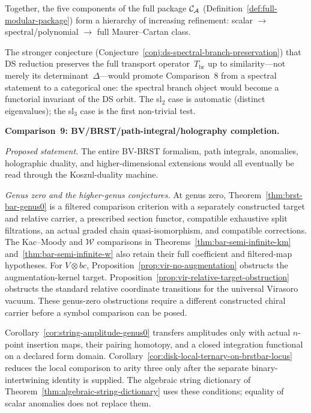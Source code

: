 Together, the five components of the full package
$\mathcal{C}_{\mathcal{A}}$
(Definition~\ref{def:full-modular-package}) form a hierarchy
of increasing refinement: scalar $\to$ spectral/polynomial
$\to$ full Maurer--Cartan class.

The stronger conjecture
(Conjecture~\ref{conj:ds-spectral-branch-preservation}) that
DS reduction preserves the full transport operator~$T_{\mathrm{br}}$
up to similarity---not merely its determinant~$\Delta$---would
promote Comparison~8 from a spectral statement to a categorical one:
the spectral branch object would become a functorial invariant of
the DS orbit.  The sl${}_2$ case is automatic (distinct eigenvalues);
the sl${}_3$ case is the first non-trivial test.

\medskip

\noindent\textbf{Comparison~9: BV/BRST/path-integral/holography
completion.}

\emph{Proposed statement.}
The entire BV-BRST formalism, path integrals, anomalies,
holographic duality, and higher-dimensional extensions would all
eventually be read through the Koszul-duality machine.

\emph{Genus zero and the higher-genus conjectures.}
At genus zero, Theorem~\ref{thm:brst-bar-genus0} is a filtered comparison criterion with a separately constructed target and relative carrier, a prescribed section functor, compatible exhaustive split filtrations, an actual graded chain quasi-isomorphism, and compatible corrections.
The Kac--Moody and $\mathcal W$ comparisons in Theorems~\ref{thm:bar-semi-infinite-km} and~\ref{thm:bar-semi-infinite-w} also retain their full coefficient and filtered-map hypotheses.
For $V\otimes bc$, Proposition~\ref{prop:vir-no-augmentation} obstructs the augmentation-kernel target.
Proposition~\ref{prop:vir-relative-target-obstruction} obstructs the standard relative coordinate transitions for the universal Virasoro vacuum.
These genus-zero obstructions require a different constructed chiral carrier before a symbol comparison can be posed.

Corollary~\ref{cor:string-amplitude-genus0} transfers amplitudes only with actual $n$-point insertion maps, their pairing homotopy, and a closed integration functional on a declared form domain.
Corollary~\ref{cor:disk-local-ternary-on-brstbar-locus} reduces the local comparison to arity three only after the separate binary-intertwining identity is supplied.
The algebraic string dictionary of Theorem~\ref{thm:algebraic-string-dictionary} uses these conditions; equality of scalar anomalies does not replace them.

